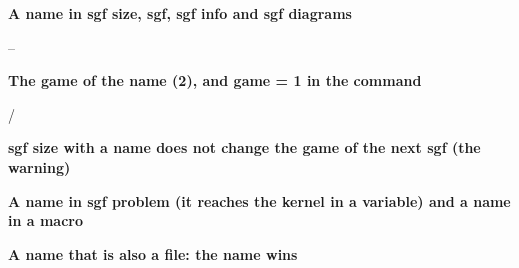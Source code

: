 \documentclass{article}
\newcommand\case[1]{\par\medskip\noindent\textbf{#1}\par\nopagebreak}
\begin{document}
\case{A name in sgf size, sgf, sgf info and sgf diagrams}
\begin{goban}[sgf size = partida, scale = 0.5]
\end{goban}
 -- 

\case{The game of the name (2), and game = 1 in the command}
\begin{goban}[sgf view = coleccion, scale = 0.5]
\end{goban}
 / 

\case{sgf size with a name does not change the game of the next sgf (the warning)}
\begin{goban}[sgf size = coleccion, scale = 0.5]
\end{goban}

\case{A name in sgf problem (it reaches the kernel in a variable) and a name in a macro}
\newcommand\gamename{partida}
\sgfinfo{\gamename}{PB}

\case{A name that is also a file: the name wins}
\end{document}
